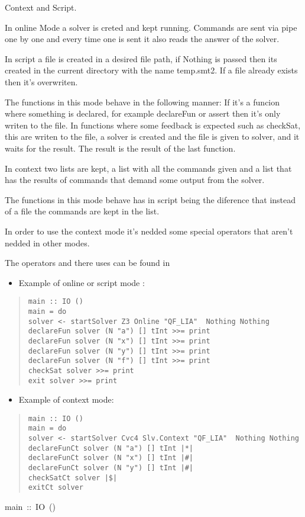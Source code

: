 \begin{haddockdesc}
Context and Script.
\par
In online Mode a solver is creted and kept running. Commands are sent
via pipe one by one and every time one is sent it also reads the answer of the
solver.
\par
In script  a file is created in a desired file path, if Nothing is passed
then its created in the current directory with the name temp.smt2.
If a file already exists then it's overwriten.
\par
The functions in this mode behave in the following manner:
If it's a funcion where something is declared, for example declareFun or assert
then it's only writen to the file. In functions where some feedback is expected
such as checkSat, this are writen to the file, a solver is created and the
file is given to solver, and it waits for the result. The result is the result
of the last function.
\par
In context  two lists are kept, a list with all the commands given and
a list that has the results of commands that demand some output from the solver.
\par
The functions in this mode behave has in script  being the diference that
instead of a file the commands are kept in the list.
\par
In order to use the context mode it's nedded some special operators that
aren't nedded in other modes.
\par
The operators and there uses can be found in 
\par
\begin{itemize}
\item
 Example of online or script mode :
\par

\end{itemize}
\begin{quote}
{\haddockverb\begin{verbatim}
main :: IO ()
main = do
solver <- startSolver Z3 Online "QF_LIA"  Nothing Nothing
declareFun solver (N "a") [] tInt >>= print
declareFun solver (N "x") [] tInt >>= print
declareFun solver (N "y") [] tInt >>= print
declareFun solver (N "f") [] tInt >>= print
checkSat solver >>= print
exit solver >>= print
\end{verbatim}}
\end{quote}
\begin{itemize}
\item
 Example of context mode:
\par

\end{itemize}
\begin{quote}
{\haddockverb\begin{verbatim}
main :: IO ()
main = do
solver <- startSolver Cvc4 Slv.Context "QF_LIA"  Nothing Nothing
declareFunCt solver (N "a") [] tInt |*|
declareFunCt solver (N "x") [] tInt |#|
declareFunCt solver (N "y") [] tInt |#|
checkSatCt solver |$|
exitCt solver
\end{verbatim}}
\end{quote}

\end{haddockdesc}
\begin{haddockdesc}
\item[
main\ ::\ IO\ ()
]
\end{haddockdesc}